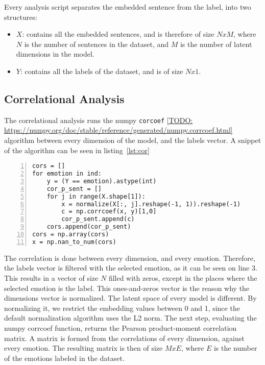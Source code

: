 Every analysis script separates the embedded sentence from the label, into two structures:

\begin{itemize}
  \item $X$: contains all the embedded sentences, and is therefore of size $NxM$, where $N$ is the number of sentences in the dataset, and $M$ is the number of latent dimensions in the model.
  \item $Y$: contains all the labels of the dataset, and is of size $Nx1$.
\end{itemize}

\subsection{Correlational Analysis}\label{sub:Correlational Analysis}
The correlational analysis runs the numpy \lstinline{corcoef} \ref{TODO: https://numpy.org/doc/stable/reference/generated/numpy.corrcoef.html} algorithm between every dimension of the model, and the labels vector. A snippet of the algorithm can be seen in listing~\ref{lst:cor}

\begin{lstlisting}[caption={Corrlelation Algorithm},label=lst:cor,frame=single,numbers=left]
cors = []
for emotion in ind:
    y = (Y == emotion).astype(int)
    cor_p_sent = []
    for j in range(X.shape[1]):
        x = normalize(X[:, j].reshape(-1, 1)).reshape(-1)
        c = np.corrcoef(x, y)[1,0]
        cor_p_sent.append(c)
    cors.append(cor_p_sent)
cors = np.array(cors)
x = np.nan_to_num(cors)
\end{lstlisting}

The correlation is done between every dimension, and every emotion. Therefore, the labels vector is filtered with the selected emotion, as it can be seen on line 3. This results in a vector of size $N$ filled with zeros, except in the places where the selected emotion is the label. This ones-and-zeros vector is the reason why the dimensions vector is normalized. The latent space of every model is different. By normalizing it, we restrict the embedding values between 0 and 1, since the default normalization algorithm uses the L2 norm.
The next step, evaluating the numpy corrcoef function, returns the Pearson product-moment correlation matrix.
A matrix is formed from the correlations of every dimension, against every emotion. The resulting matrix is then of size $MxE$, where $E$ is the number of the emotions labeled in the dataset.


